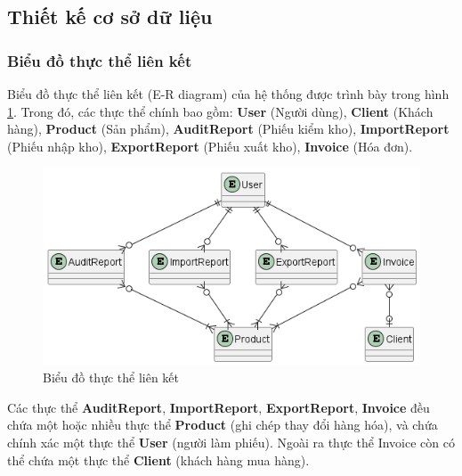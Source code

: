 \documentclass[../DoAn.tex]{subfiles}
\begin{document}
\subsection{Thiết kế cơ sở dữ liệu}
\label{subsection:detaildesign-database}

\subsubsection{Biểu đồ thực thể liên kết}
\label{subsubsection:detaildesign-database-er}
Biểu đồ thực thể liên kết (E-R diagram) của hệ thống được trình bày trong hình \ref{fig:erdiagram}. Trong đó, các thực thể chính bao gồm: \textbf{User} (Người dùng), \textbf{Client} (Khách hàng), \textbf{Product} (Sản phẩm), \textbf{AuditReport} (Phiếu kiểm kho), \textbf{ImportReport} (Phiếu nhập kho), \textbf{ExportReport} (Phiếu xuất kho), \textbf{Invoice} (Hóa đơn).
\begin{figure}[H]
    \centering
    \includegraphics[width=1\textwidth]{Hinhve/design/class/EntityRelational}
    \caption{Biểu đồ thực thể liên kết}
    \label{fig:erdiagram}
\end{figure}
Các thực thể \textbf{AuditReport}, \textbf{ImportReport}, \textbf{ExportReport}, \textbf{Invoice} đều chứa một hoặc nhiều thực thể \textbf{Product} (ghi chép thay đổi hàng hóa), và chứa chính xác một thực thể \textbf{User} (người làm phiếu). Ngoài ra thực thể Invoice còn có thể chứa một thực thể \textbf{Client} (khách hàng mua hàng).
\vfill
\end{document}
